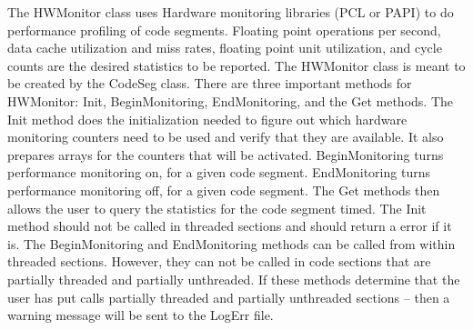 %


The HWMonitor class uses Hardware monitoring libraries (PCL or PAPI)
to do performance profiling of code segments. Floating point operations
per second, data cache utilization and miss rates, floating point unit
utilization, and cycle counts are the desired statistics to be reported.
The HWMonitor class is meant to be created by the CodeSeg
class. There are three important methods for HWMonitor: Init, BeginMonitoring,
EndMonitoring, and the Get methods. The Init method does the initialization needed
to figure out which hardware monitoring counters need to be used and verify
that they are available. It also prepares arrays for the counters that
will be activated. BeginMonitoring turns performance monitoring on, for
a given code segment. EndMonitoring turns performance monitoring off, for
a given code segment. The Get methods then allows the user to query the statistics
for the code segment timed. The Init method should not be
called in threaded sections and should return a error if it is. The BeginMonitoring
and EndMonitoring methods can be called from within threaded sections. However,
they can not be called in code sections that are partially threaded and
partially unthreaded. If these methods determine that the user has put calls
partially threaded and partially unthreaded sections -- then a warning message
will be sent to the LogErr file.

